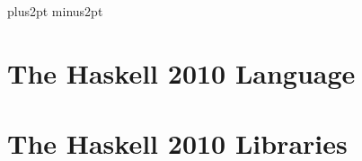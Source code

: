 \documentclass[twoside,10pt]{book}
\newcommand{\ifhtml}[2]{%
\ifx \HCode\Undef
#2
\else
#1
\fi
}
\newcommand{\startnewsection}{\clearpage}
\newcommand{\startnewstuff}{\cleardoublepage}
\begin{document}


\clearpage
\clearpage
{}
\tableofcontents
\startnewstuff

\parskip=10pt plus2pt minus2pt
\setlength{\parindent}{0cm}




\pagestyle{headings}
\startnewstuff
{}

\part{The Haskell 2010 Language}

\startnewsection
\startnewsection
\startnewsection
\startnewsection
\startnewsection
\startnewsection
\startnewsection
\startnewsection

\startnewsection
\startnewsection
\startnewsection
\startnewsection



\part{The Haskell 2010 Libraries}
\label{libraries}





















 











\startnewstuff


\ifhtml{}{}


%
\startnewstuff
\ifhtml{}{\printindex}
\end{document}
